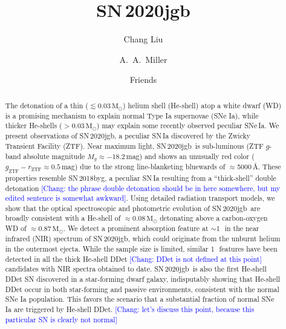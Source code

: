 \documentclass[twocolumn]{aastex631}
\newcommand{\sn}{SN\,2020jgb}
\newcommand{\chang}[1]{\textcolor{blue}{[Chang: #1]}}
\begin{document}
\title{\sn}

\author[0000-0002-7866-4531]{Chang Liu}

\author[0000-0001-9515-478X]{A.~A.~Miller}

\author{Friends}

\begin{abstract} 
%
The detonation of a thin ($\lesssim$0.03\,$\mathrm{M_\odot}$) helium shell
(He-shell) atop a white dwarf (WD) is a promising mechanism to explain normal
Type Ia supernovae (SNe Ia), while thicker He-shells
($>$0.03\,$\mathrm{M_\odot}$) may explain some recently observed peculiar
SNe\,Ia. We present observations of \sn, a peculiar SN\,Ia discovered by the
Zwicky Transient Facility (ZTF). Near maximum light, \sn\ is sub-luminous (ZTF
$g$-band absolute magnitude $M_g\approx -18.2$\,mag) and shows an unusually red
color ($g_\mathrm{ZTF}-r_\mathrm{ZTF}\approx 0.5$\,mag) due to the strong
line-blanketing bluewards of $\approx$5000\,\AA. These properties resemble
SN\,2018byg, a peculiar SN\,Ia resulting from a ``thick-shell'' double
detonation \chang{the phrase double detonation should be in here somewhere, but
my edited sentence is somewhat awkward}. Using detailed radiation transport
models, we show that the optical spectroscopic and photometric evolution of
\sn\ are broadly consistent with a He-shell of
$\approx$0.08\,$\mathrm{M_\odot}$ detonating above a carbon-oxygen WD of
$\approx$0.87\,$\mathrm{M_\odot}$. We detect a prominent absorption feature at
$\sim$1\,\micron\ in the near infrared (NIR) spectrum of \sn, which could
originate from the unburnt helium in the outermost ejecta. While the sample
size is limited, similar 1\,\micron\ features have been detected in all the
thick He-shell DDet \chang{DDet is not defined at this point} candidates with
NIR spectra obtained to date. \sn\ is also the first He-shell DDet SN
discovered in a star-forming dwarf galaxy, indisputably showing that He-shell
DDet occur in both star-forming and passive environments, consistent with the
normal SNe Ia population. This favors the scenario that a substantial fraction
of normal SNe Ia are triggered by He-shell DDet. \chang{let's discuss this
point, because this particular SN is clearly not normal}
%
\end{abstract}
\end{document}
